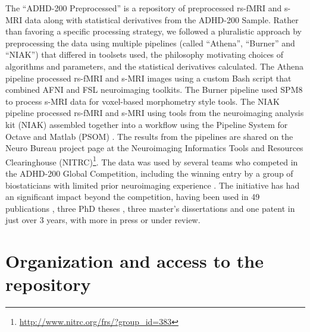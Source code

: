 \documentclass[preprint,12pt,3p]{elsarticle}
\begin{document}
The ``ADHD-200 Preprocessed'' is a repository of preprocessed rs-fMRI and s-MRI data along with statistical derivatives from the ADHD-200 Sample. Rather than favoring a specific processing strategy, we followed a pluralistic approach by preprocessing the data using multiple pipelines (called ``Athena'', ``Burner'' and ``NIAK'') that differed in toolsets used, the philosophy motivating choices of algorithms and parameters, and the statistical derivatives calculated. The Athena pipeline processed rs-fMRI and s-MRI images using a custom Bash script that combined AFNI \cite{cox1996afni} and FSL \cite{smith2004advances} neuroimaging toolkits. The Burner pipeline used SPM8 \cite{ashburner2012spm8} to process s-MRI data for voxel-based morphometry style tools. The NIAK pipeline processed rs-fMRI and s-MRI using tools from the neuroimaging analysis kit (NIAK) \cite{Bellec2011} assembled together into a workflow using the Pipeline System for Octave and Matlab (PSOM) \cite{Bellec2012}. The results from the pipelines are shared on the Neuro Bureau project page at the Neuroimaging Informatics Tools and Resources Clearinghouse (NITRC)\footnote{\url{http://www.nitrc.org/frs/?group_id=383}}. The data was used by several teams who competed in the ADHD-200 Global Competition, including the winning entry by a group of biostaticians with limited prior neuroimaging experience \cite{Eloyan2012}. The initiative has had an significant impact beyond the competition, having been used in 49 publications \cite{Rangarajan2014, Liang2012, Tabas2014, Rangarajan2015, Mahanand2013, Lifshitz2012, Fujita2013, Ji2011, Li2015, Li2013, Liu2012, DosSantosSiqueira2014, Olivetti2014, Han2015, Wang2013a, Subramanian2013, Dey2014, Bellec2012, Bohland2012, Chang2012, Cheng2012, Colby2012, Dai2012, Dey2012, Eloyan2012, Olivetti2012, Sato2012a, Carmona2015, Carmona2015a, Hou2015, Deshpande2015, She2014, Lavoie-Courchesne2012b, Chen2015, Nunez-Garcia2015, Solmaz2012, Anderson2014, KadkhodaeianBakhtiari2012, Sato2013, Kyeong2015, Sato2012, Takahashi2012, He2013, Kong2013, Yao2013, Yang2015, Ahn2015, Fujita2014, Reiss2014}, three PhD theses \cite{Colby2012a, Dey2013, Zhang2012}, three master's dissertations \cite{VanGalenLast2011, Vidal2014, Wang2013} and one patent \cite{Dey2013} in just over 3 years, with more in press or under review.

\section{Organization and access to the repository}
\end{document}
